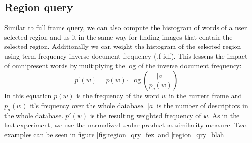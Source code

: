 \documentclass{paper}
\begin{document}
\subsection{Region query}
Similar to full frame query, we can also compute the histogram of words of a user 
selected region and us it in the same way for finding images that contain the 
selected region. Additionally we can weight the histogram of the selected region
using term frequency inverse document frequency (tf-idf). This lessens the impact
of omnipresent words by multiplying the log of the inverse document frequency:
\begin{equation}
	p'(w) = p(w) \cdot \log(\frac{|a|}{p_a(w)})
\end{equation}
In this equation $p(w)$ is the frequency of the word $w$ in the current frame and $p_a(w)$
 it's frequency over the whole database. $|a|$ is the number of descriptors in the 
 whole database. $p'(w)$ is the resulting weighted frequency of $w$.
 As in the last experiment, we use the normalized scalar product as similarity measure.
Two examples can be seen in figure \ref{fig:region_qry_fez} and \ref{region_qry_blah}
\end{document}
